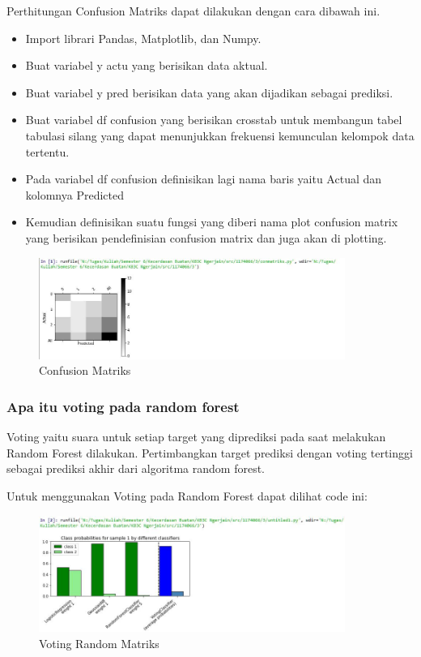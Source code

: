 \hfill\break
Perthitungan Confusion Matriks dapat dilakukan dengan cara dibawah ini.
\begin{itemize}
\item
Import librari Pandas, Matplotlib, dan Numpy.
\item
Buat variabel y actu yang berisikan data aktual.
\item
Buat variabel y pred berisikan data yang akan dijadikan sebagai prediksi.
\item
Buat variabel df confusion yang berisikan crosstab untuk membangun tabel tabulasi silang yang dapat menunjukkan frekuensi kemunculan kelompok data tertentu.
\item
Pada variabel df confusion definisikan lagi nama baris yaitu Actual dan kolomnya Predicted
\item
Kemudian definisikan suatu fungsi yang diberi nama plot confusion matrix yang berisikan pendefinisian confusion matrix dan juga akan di plotting.

\end{itemize}
\begin{figure}[H]
\centerline{\includegraphics[width=10cm]{figures/1174074/3/2.jpg}}
\caption{Confusion Matriks}
\label{labelgambar}
\end{figure}

\subsubsection{Apa itu voting pada random forest}

\hfill\break
Voting yaitu suara untuk setiap target yang diprediksi pada saat melakukan Random Forest dilakukan. Pertimbangkan target prediksi dengan voting tertinggi sebagai prediksi akhir dari algoritma random forest.

Untuk menggunakan Voting pada Random Forest dapat dilihat code ini:

\begin{figure}[H]
\centerline{\includegraphics[width=10cm]{figures/1174074/3/3.jpg}}
\caption{Voting Random Matriks}
\label{labelgambar}
\end{figure}


